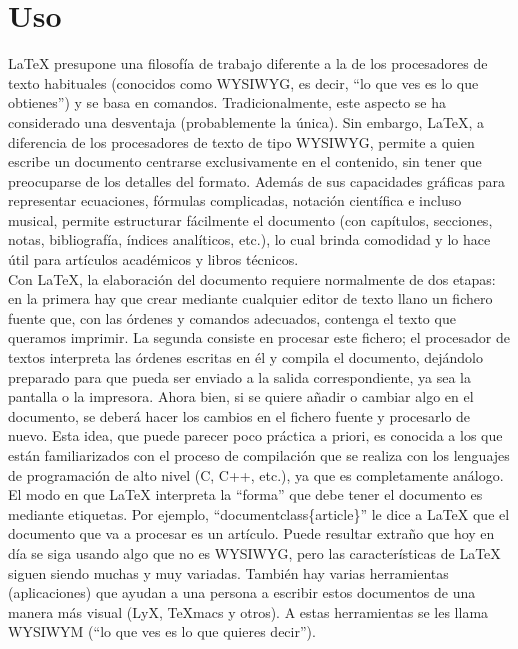 \documentclass[12pt,a4paper,spanish]{book}
\begin{document}
\section{Uso}
\LaTeX{} presupone una filosof\'ia de trabajo diferente a la de los procesadores de texto habituales (conocidos como WYSIWYG, es decir, ``lo que ves es lo que obtienes'') y se basa en comandos. Tradicionalmente, este aspecto se ha considerado una desventaja (probablemente la \'unica). Sin embargo, \LaTeX{}, a diferencia de los procesadores de texto de tipo WYSIWYG, permite a quien escribe un documento centrarse exclusivamente en el contenido, sin tener que preocuparse de los detalles del formato. Adem\'as de sus capacidades gr\'aficas para representar ecuaciones, f\'ormulas complicadas, notaci\'on cient\'ifica e incluso musical, permite estructurar f\'acilmente el documento (con cap\'itulos, secciones, notas, bibliograf\'ia, \'indices anal\'iticos, etc.), lo cual brinda comodidad y lo hace \'util para art\'iculos acad\'emicos y libros t\'ecnicos.\\

Con \LaTeX{}, la elaboraci\'on del documento requiere normalmente de dos etapas: en la primera hay que crear mediante cualquier editor de texto llano un fichero fuente que, con las \'ordenes y comandos adecuados, contenga el texto que queramos imprimir. La segunda consiste en procesar este fichero; el procesador de textos interpreta las \'ordenes escritas en \'el y compila el documento, dej\'andolo preparado para que pueda ser enviado a la salida correspondiente, ya sea la pantalla o la impresora. Ahora bien, si se quiere a\~nadir o cambiar algo en el documento, se deber\'a hacer los cambios en el fichero fuente y procesarlo de nuevo. Esta idea, que puede parecer poco pr\'actica a priori, es conocida a los que est\'an familiarizados con el proceso de compilaci\'on que se realiza con los lenguajes de programaci\'on de alto nivel (C, C++, etc.), ya que es completamente an\'alogo.\\

El modo en que \LaTeX{} interpreta la ``forma'' que debe tener el documento es mediante etiquetas. Por ejemplo, ``documentclass\{article\}'' le dice a \LaTeX{} que el documento que va a procesar es un art\'iculo. Puede resultar extra\~no que hoy en d\'ia se siga usando algo que no es WYSIWYG, pero las caracter\'isticas de \LaTeX{} siguen siendo muchas y muy variadas. Tambi\'en hay varias herramientas (aplicaciones) que ayudan a una persona a escribir estos documentos de una manera m\'as visual (LyX, TeXmacs y otros). A estas herramientas se les llama WYSIWYM (``lo que ves es lo que quieres decir'').\\
\end{document}
